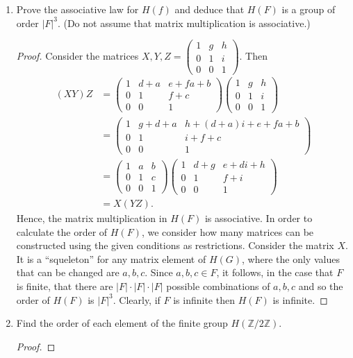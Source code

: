 \documentclass[12pt]{article}
\newcommand{\Z}{\mathbb{Z}}
\newenvironment{problem}[2][Problem]{\begin{trivlist} \item[\hskip \labelsep {\bfseries #1}\hskip \labelsep {\bfseries #2.}]}{\end{trivlist}}
\begin{document}
\begin{problem}{11}
\begin{enumerate}
  \item Prove the associative law for $H(f)$ and deduce that $H(F)$ is a group of order $|F|^{3}$. (Do not assume that matrix multiplication is associative.)
\begin{proof}
  Consider the matrices $X,Y, Z=\begin{pmatrix} 1 & g & h \\ 0 & 1 & i\\ 0 & 0 & 1\end{pmatrix}$. Then
\begin{align*}
  (XY)Z &= \begin{pmatrix} 1 & d+a & e+fa+b \\ 0 & 1 & f+c\\ 0 & 0 & 1\end{pmatrix} \begin{pmatrix} 1 & g & h\\ 0 & 1 & i \\ 0 & 0 & 1\end{pmatrix}\\
  &= \begin{pmatrix} 1 & g+d+a & h+(d+a)i+e+fa+b\\ 0 & 1 & i + f +c \\ 0 & 0 & 1\end{pmatrix}\\
  &= \begin{pmatrix} 1 & a & b\\ 0 & 1 & c\\ 0 & 0 & 1\end{pmatrix} \begin{pmatrix} 1 & d+g & e+di + h \\ 0 & 1 & f+i \\ 0 & 0 & 1\end{pmatrix}\\
  &= X(YZ).
\end{align*}
Hence, the matrix multiplication in $H(F)$ is associative. In order to calculate the order of $H(F)$, we consider how many matrices can be constructed using the given conditions as restrictions. Consider the matrix $X$. It is a ``squeleton'' for any matrix element of $H(G)$, where the only values that can be changed are $a,b,c$. Since $a,b,c\in F$, it follows, in the case that $F$ is finite,  that there are $|F|\cdot|F|\cdot|F|$ possible combinations of $a,b,c$ and so the order of $H(F)$ is $|F|^{3}$. Clearly, if $F$ is infinite then $H(F)$ is infinite.
\end{proof}
  \item Find the order of each element of the finite group $H(\Z/2\Z)$.
\begin{proof}


\end{proof}
\end{enumerate}
\end{problem}
\end{document}
